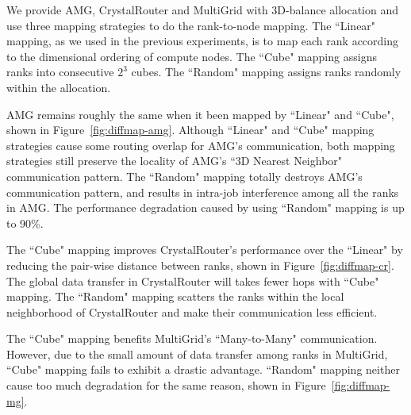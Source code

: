We provide AMG, CrystalRouter and MultiGrid with 3D-balance allocation and 
use three mapping strategies to do the rank-to-node mapping. 
The ``Linear" mapping, as we used in the previous experiments, 
is to map each rank according to the dimensional ordering of compute nodes. 
The ``Cube" mapping assigns ranks into consecutive $2^{3}$ cubes. 
The ``Random" mapping assigns ranks randomly within the allocation. 

AMG remains roughly the same when it been mapped by ``Linear" and ``Cube", 
shown in Figure~\ref{fig:diffmap-amg}. 
Although ``Linear" and ``Cube" mapping strategies cause some routing overlap for AMG's communication, 
both mapping strategies still preserve the locality of AMG's ``3D Nearest Neighbor" communication pattern. 
The ``Random" mapping totally destroys AMG's communication pattern, 
and results in intra-job interference among all the ranks in AMG. 
The performance degradation caused by using ``Random" mapping is up to 90\%.

The ``Cube" mapping improves CrystalRouter's performance over the ``Linear" 
by reducing the pair-wise distance between ranks, shown in Figure~\ref{fig:diffmap-cr}. 
The global data transfer in CrystalRouter will takes fewer hops with ``Cube" mapping. 
The ``Random" mapping scatters the ranks within the local neighborhood 
of CrystalRouter and make their communication less efficient. 


The ``Cube" mapping benefits MultiGrid's ``Many-to-Many" communication. 
However, due to the small amount of data transfer among ranks in MultiGrid, 
``Cube" mapping fails to exhibit a drastic advantage. 
``Random" mapping neither cause too much degradation for the same reason, 
shown in Figure~\ref{fig:diffmap-mg}.


